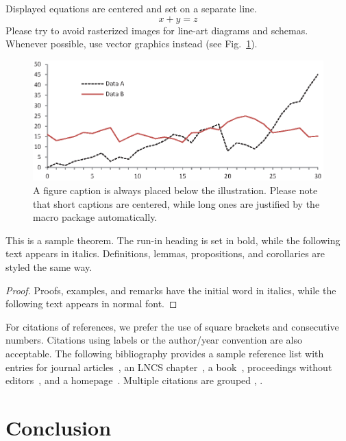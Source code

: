 \documentclass[runningheads,custombib]{llncs}
\begin{document}
\noindent Displayed equations are centered and set on a separate
line.
\begin{equation}
x + y = z
\end{equation}
Please try to avoid rasterized images for line-art diagrams and
schemas. Whenever possible, use vector graphics instead (see
Fig.~\ref{fig1}).

\begin{figure}
\includegraphics[width=\textwidth]{fig1.eps}
\caption{A figure caption is always placed below the illustration.
Please note that short captions are centered, while long ones are
justified by the macro package automatically.} \label{fig1}
\end{figure}

\begin{theorem}
This is a sample theorem. The run-in heading is set in bold, while
the following text appears in italics. Definitions, lemmas,
propositions, and corollaries are styled the same way.
\end{theorem}
%
%
\begin{proof}
Proofs, examples, and remarks have the initial word in italics,
while the following text appears in normal font.
\end{proof}
For citations of references, we prefer the use of square brackets
and consecutive numbers. Citations using labels or the author/year
convention are also acceptable. The following bibliography provides
a sample reference list with entries for journal
articles~\cite{ref_article1}, an LNCS chapter~\cite{ref_lncs1}, a
book~\cite{ref_book1}, proceedings without editors~\cite{ref_proc1},
and a homepage~\cite{ref_url1}. Multiple citations are grouped
\cite{ref_article1,ref_lncs1,ref_book1},
\cite{ref_article1,ref_book1,ref_proc1,ref_url1}.
\section{Conclusion}
%
%
%
% 
% 
\end{document}
